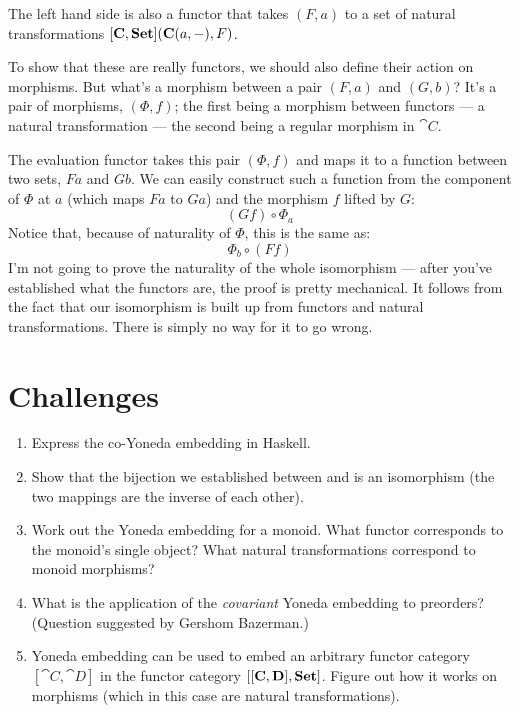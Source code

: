 The left hand side is also a functor that takes $(F, a)$ to a
set of natural transformations $[\mathbf{C}, \mathbf{Set}](\mathbf{C}(a, -), F)$.

To show that these are really functors, we should also define their
action on morphisms. But what's a morphism between a pair
$(F, a)$ and $(G, b)$? It's a pair of morphisms,
$(\Phi, f)$; the first being a morphism between functors --- a
natural transformation --- the second being a regular morphism in
$\cat{C}$.

The evaluation functor takes this pair $(\Phi, f)$ and maps it to a
function between two sets, $F a$ and $G b$. We can
easily construct such a function from the component of $\Phi$ at
$a$ (which maps $F a$ to $G a$) and the morphism
$f$ lifted by $G$:
\[(G f) \circ \Phi_a\]
Notice that, because of naturality of $\Phi$, this is the same as:
\[\Phi_b \circ (F f)\]
I'm not going to prove the naturality of the whole isomorphism --- after
you've established what the functors are, the proof is pretty
mechanical. It follows from the fact that our isomorphism is built up
from functors and natural transformations. There is simply no way for it
to go wrong.

\section{Challenges}

\begin{enumerate}
  \tightlist
  \item
        Express the co-Yoneda embedding in Haskell.
  \item
        Show that the bijection we established between  and
         is an isomorphism (the two mappings are the inverse of
        each other).
  \item
        Work out the Yoneda embedding for a monoid. What functor corresponds
        to the monoid's single object? What natural transformations correspond
        to monoid morphisms?
  \item
        What is the application of the \emph{covariant} Yoneda embedding to
        preorders? (Question suggested by Gershom Bazerman.)
  \item
        Yoneda embedding can be used to embed an arbitrary functor category
        $[\cat{C}, \cat{D}]$ in the functor category
        $[[\mathbf{C}, \mathbf{D}], \mathbf{Set}]$. Figure out how it works on morphisms
        (which in this case are natural transformations).
\end{enumerate}

